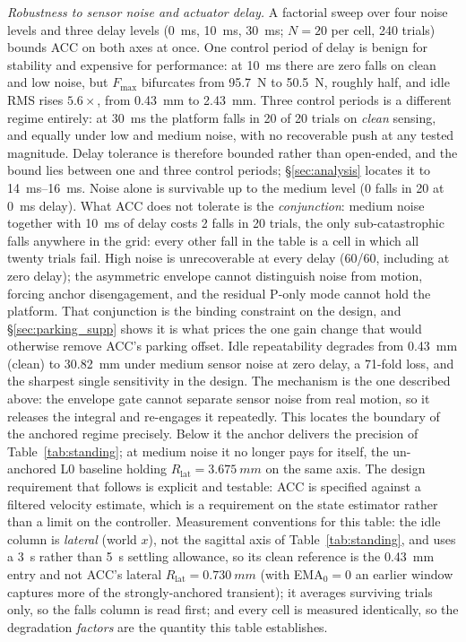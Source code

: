 \documentclass[conference]{IEEEtran}
\begin{document}
\emph{Robustness to sensor noise and actuator delay.}
A factorial sweep over four noise levels and three delay levels (\SI{0}{ms}, \SI{10}{ms}, \SI{30}{ms}; $N{=}20$ per cell, \num{240} trials) bounds ACC on both axes at once.
One control period of delay is benign for stability and expensive for performance: at \SI{10}{ms} there are zero falls on clean and low noise, but $F_{\max}$ bifurcates from \SI{95.7}{N} to \SI{50.5}{N}, roughly half, and idle RMS rises $5.6{\times}$, from \SI{0.43}{mm} to \SI{2.43}{mm}. Three control periods is a different regime entirely: at \SI{30}{ms} the platform falls in \num{20} of \num{20} trials on \emph{clean} sensing, and equally under low and medium noise, with no recoverable push at any tested magnitude. Delay tolerance is therefore bounded rather than open-ended, and the bound lies between one and three control periods; \S\ref{sec:analysis} locates it to \SIrange{14}{16}{ms}.
Noise alone is survivable up to the medium level (\num{0} falls in \num{20} at \SI{0}{ms} delay).
What ACC does not tolerate is the \emph{conjunction}: medium noise together with \SI{10}{ms} of delay costs \num{2} falls in \num{20} trials, the only sub-catastrophic falls anywhere in the grid: every other fall in the table is a cell in which all twenty trials fail. High noise is unrecoverable at every delay (\num{60}/\num{60}, including at zero delay); the asymmetric envelope cannot distinguish noise from motion, forcing anchor disengagement, and the residual P-only mode cannot hold the platform.
That conjunction is the binding constraint on the design, and \S\ref{sec:parking_supp} shows it is what prices the one gain change that would otherwise remove ACC's parking offset.
Idle repeatability degrades from \SI{0.43}{mm} (clean) to \SI{30.82}{mm} under medium sensor noise at zero delay, a \num{71}-fold loss, and the sharpest single sensitivity in the design. The mechanism is the one described above: the envelope gate cannot separate sensor noise from real motion, so it releases the integral and re-engages it repeatedly. This locates the boundary of the anchored regime precisely. Below it the anchor delivers the precision of Table~\ref{tab:standing}; at medium noise it no longer pays for itself, the un-anchored L0 baseline holding $R_{\text{lat}}=\SI{3.675}{mm}$ on the same axis. The design requirement that follows is explicit and testable: ACC is specified against a filtered velocity estimate, which is a requirement on the state estimator rather than a limit on the controller. Measurement conventions for this table: the idle column is \emph{lateral} (world $x$), not the sagittal axis of Table~\ref{tab:standing}, and uses a \SI{3}{s} rather than \SI{5}{s} settling allowance, so its clean reference is the \SI{0.43}{mm} entry and not ACC's lateral $R_{\text{lat}}=\SI{0.730}{mm}$ (with EMA$_0{=}0$ an earlier window captures more of the strongly-anchored transient); it averages surviving trials only, so the falls column is read first; and every cell is measured identically, so the degradation \emph{factors} are the quantity this table establishes.
\end{document}
